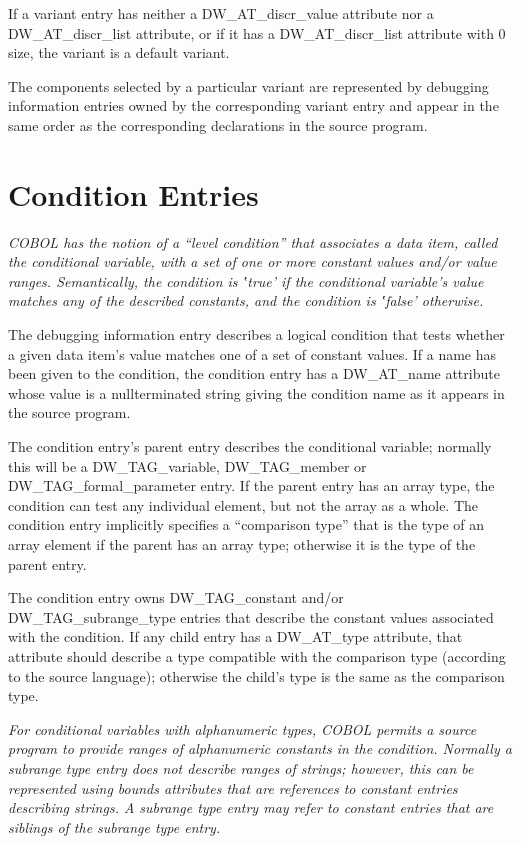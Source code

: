 If a variant entry has neither a DW\_AT\_discr\_value
attribute nor a DW\_AT\_discr\_list attribute, or if it has
a DW\_AT\_discr\_list attribute with 0 size, the variant is a
default variant.

The components selected by a particular variant are represented
by debugging information entries owned by the corresponding
variant entry and appear in the same order as the corresponding
declarations in the source program.

\section{Condition Entries}
\label{chap:conditionentries}

\textit{COBOL has the notion of a ``level condition'' that
associates a data item, called the conditional variable, with
a set of one or more constant values and/or value ranges.
Semantically, the condition is ‛true’ if the conditional
variable's value matches any of the described constants,
and the condition is ‛false’ otherwise.}

The  debugging information entry
describes a
logical condition that tests whether a given data item’s
value matches one of a set of constant values. If a name
has been given to the condition, the condition entry has a
DW\_AT\_name attribute whose value is a null\dash terminated string
giving the condition name as it appears in the source program.

The condition entry's parent entry describes the conditional
variable; normally this will be a DW\_TAG\_variable,
DW\_TAG\_member or DW\_TAG\_formal\_parameter entry. If the parent
entry has an array type, the condition can test any individual
element, but not the array as a whole. The condition entry
implicitly specifies a “comparison type” that is the
type of an array element if the parent has an array type;
otherwise it is the type of the parent entry.

The condition entry owns DW\_TAG\_constant and/or
DW\_TAG\_subrange\_type entries that describe the constant
values associated with the condition. If any child entry has
a DW\_AT\_type attribute, that attribute should describe a type
compatible with the comparison type (according to the source
language); otherwise the child’s type is the same as the
comparison type.

\textit{For conditional variables with alphanumeric types, COBOL
permits a source program to provide ranges of alphanumeric
constants in the condition. Normally a subrange type entry
does not describe ranges of strings; however, this can be
represented using bounds attributes that are references to
constant entries describing strings. A subrange type entry may
refer to constant entries that are siblings of the subrange
type entry.}


